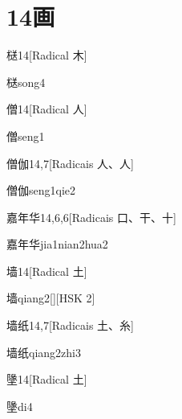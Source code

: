 
\section*{14画}

\begin{entry}{㮸}{14}[Radical ⽊]
  \begin{phonetics}{㮸}{song4}
  \end{phonetics}
\end{entry}

\begin{entry}{僧}{14}[Radical ⼈]
  \begin{phonetics}{僧}{seng1}
  \end{phonetics}
\end{entry}

\begin{entry}{僧伽}{14,7}[Radicais ⼈、⼈]
  \begin{phonetics}{僧伽}{seng1qie2}
  \end{phonetics}
\end{entry}

\begin{entry}{嘉年华}{14,6,6}[Radicais ⼝、⼲、⼗]
  \begin{phonetics}{嘉年华}{jia1nian2hua2}
  \end{phonetics}
\end{entry}

\begin{entry}{墙}{14}[Radical ⼟]
  \begin{phonetics}{墙}{qiang2}[][HSK 2]
  \end{phonetics}
\end{entry}

\begin{entry}{墙纸}{14,7}[Radicais ⼟、⽷]
  \begin{phonetics}{墙纸}{qiang2zhi3}
  \end{phonetics}
\end{entry}

\begin{entry}{墬}{14}[Radical ⼟]
  \begin{phonetics}{墬}{di4}
  \end{phonetics}
\end{entry}

